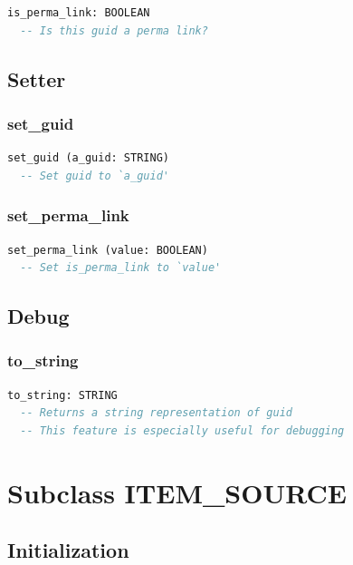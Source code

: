 \begin{lstlisting}[language=Eiffel]
is_perma_link: BOOLEAN
  -- Is this guid a perma link?
\end{lstlisting}

\subsection{Setter}
\label{sec:item-guid-setter}

\subsubsection{set\_guid}

\begin{lstlisting}[language=Eiffel]
set_guid (a_guid: STRING)
  -- Set guid to `a_guid'
\end{lstlisting}

\subsubsection{set\_perma\_link}

\begin{lstlisting}[language=Eiffel]
set_perma_link (value: BOOLEAN)
  -- Set is_perma_link to `value'
\end{lstlisting}

\subsection{Debug}
\label{sec:item-guid-debug}

\subsubsection{to\_string}

\begin{lstlisting}[language=Eiffel]
to_string: STRING
  -- Returns a string representation of guid
  -- This feature is especially useful for debugging
\end{lstlisting}

\section{Subclass ITEM\_SOURCE}
\label{sec:item-source}

\subsection{Initialization}
\label{sec:item-source-initialization}

